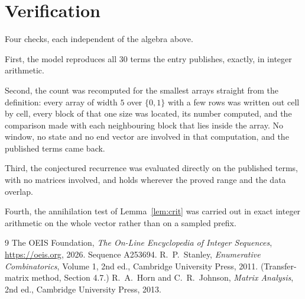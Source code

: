 \documentclass[11pt,a4paper]{article}
\theoremstyle{plain}
\theoremstyle{definition}
\begin{document}
\section{Verification}

Four checks, each independent of the algebra above.

First, the model reproduces all $30$ terms the entry publishes, exactly, in integer
arithmetic.

Second, the count was recomputed for the smallest arrays straight from the definition: every
array of width $5$ over $\{0,1\}$ with a few rows was written out cell by cell, every block of
that one size was located, its number computed, and the comparison made with each neighbouring block
that lies inside the array. No window, no state and no end vector are involved in that
computation, and the published terms came back.

Third, the conjectured recurrence was evaluated directly on the published terms, with no
matrices involved, and holds wherever the proved range and the data overlap.

Fourth, the annihilation test of Lemma~\ref{lem:crit} was carried out in exact integer
arithmetic on the whole vector rather than on a sampled prefix.

\begin{thebibliography}{9}
 The OEIS Foundation, \emph{The On-Line Encyclopedia of Integer
Sequences}, \url{https://oeis.org}, 2026. Sequence A253694.
 R.~P.~Stanley, \emph{Enumerative Combinatorics}, Volume 1, 2nd ed.,
Cambridge University Press, 2011. (Transfer-matrix method, Section 4.7.)
 R.~A.~Horn and C.~R.~Johnson, \emph{Matrix Analysis}, 2nd ed., Cambridge
University Press, 2013.
\end{thebibliography}
\end{document}
